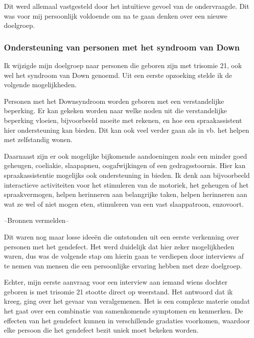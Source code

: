 Dit werd allemaal vastgesteld door het intuïtieve gevoel van de ondervraagde. Dit was voor mij persoonlijk voldoende om na te gaan denken over een nieuwe doelgroep.

\subsubsection{Ondersteuning van personen met het syndroom van Down}
\label{ondersteuning van personen met het syndroom van Down}
Ik wijzigde mijn doelgroep naar personen die geboren zijn met trisomie 21, ook wel het syndroom van Down genoemd. Uit een eerste opzoeking stelde ik de volgende mogelijkheden.

Personen met het Downsyndroom worden geboren met een verstandelijke beperking. Er kan gekeken worden naar welke noden uit die verstandelijke beperking vloeien, bijvoorbeeld moeite met rekenen, en hoe een spraakassistent hier ondersteuning kan bieden. Dit kan ook veel verder gaan als in vb. het helpen met zelfstandig wonen.

Daarnaast zijn er ook mogelijke bijkomende aandoeningen zoals een minder goed geheugen, coeliakie, slaapapneu, oogafwijkingen of een gedragsstoornis. Hier kan spraakassistentie mogelijks ook ondersteuning in bieden. Ik denk aan bijvoorbeeld interactieve activiteiten voor het stimuleren van de motoriek, het geheugen of het spraakvermogen, helpen herinneren aan belangrijke taken, helpen herinneren aan wat ze wel of niet mogen eten, stimuleren van een vast slaappatroon, enzovoort.

--Bronnen vermelden--

Dit waren nog maar losse ideeën die ontstonden uit een eerste verkenning over personen met het gendefect. Het werd duidelijk dat hier zeker mogelijkheden waren, dus was de volgende stap om hierin gaan te verdiepen door interviews af te nemen van mensen die een persoonlijke ervaring hebben met deze doelgroep.

Echter, mijn eerste aanvraag voor een interview aan iemand wiens dochter geboren is met trisomie 21 stootte direct op weerstand. Het antwoord dat ik kreeg, ging over het gevaar van veralgemenen. Het is een complexe materie omdat het gaat over een combinatie van samenkomende symptomen en kenmerken. De effecten van het gendefect kunnen in verschillende gradaties voorkomen, waardoor elke persoon die het gendefect bezit uniek moet bekeken worden.